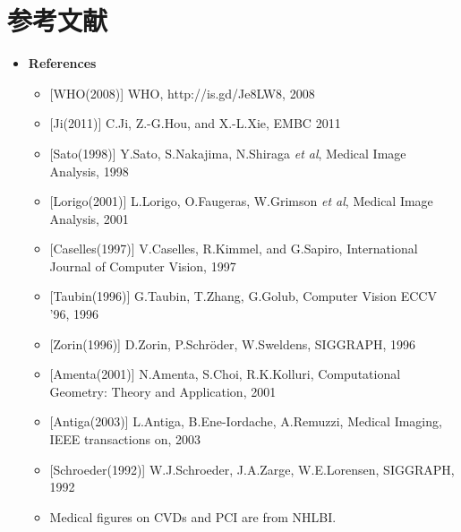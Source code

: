 \section{参考文献}

\begin{frame}
\begin{itemize}
\item \footnotesize\textbf{References}
\begin{itemize}
\item \footnotesize{[WHO(2008)]       WHO, http://is.gd/Je8LW8, 2008}
\item \footnotesize{[Ji(2011)]        C.Ji, Z.-G.Hou, and X.-L.Xie, EMBC 2011}
\item \footnotesize{[Sato(1998)]      Y.Sato, S.Nakajima, N.Shiraga \textit{et al}, Medical Image Analysis, 1998}%
\item \footnotesize{[Lorigo(2001)]    L.Lorigo, O.Faugeras, W.Grimson \textit{et al}, Medical Image Analysis, 2001}
\item \footnotesize{[Caselles(1997)]  V.Caselles, R.Kimmel, and G.Sapiro, International Journal of Computer Vision, 1997}
\item \footnotesize{[Taubin(1996)]    G.Taubin, T.Zhang, G.Golub, Computer Vision ECCV '96, 1996}%
\item \footnotesize{[Zorin(1996)]     D.Zorin, P.Schr\"{o}der, W.Sweldens, SIGGRAPH, 1996}
\item \footnotesize{[Amenta(2001)]    N.Amenta, S.Choi, R.K.Kolluri, Computational Geometry: Theory and Application, 2001}
\item \footnotesize{[Antiga(2003)]    L.Antiga, B.Ene-Iordache, A.Remuzzi, Medical Imaging, IEEE transactions on, 2003}
\item \footnotesize{[Schroeder(1992)] W.J.Schroeder, J.A.Zarge, W.E.Lorensen, SIGGRAPH, 1992}
\item \footnotesize{Medical figures on CVDs and PCI are from NHLBI.}
\end{itemize}
\end{itemize}
\end{frame}